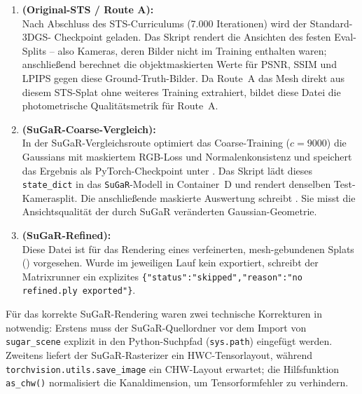 \begin{enumerate}
  \item \textbf{ (Original-STS / Route A):}\\
        Nach Abschluss des STS-Curriculums (7.000 Iterationen) wird der Standard-3DGS-
        Checkpoint  geladen. Das
        Skript  rendert die Ansichten des festen
        Eval-Splits -- also Kameras, deren Bilder nicht im Training enthalten
        waren; anschließend berechnet  die
        objektmaskierten Werte für PSNR, SSIM und LPIPS gegen diese
        Ground-Truth-Bilder.
        Da Route~A das Mesh direkt aus diesem STS-Splat ohne weiteres Training
        extrahiert, bildet diese Datei die photometrische Qualitätsmetrik für Route~A.
  \item \textbf{ (SuGaR-Coarse-Vergleich):}\\
        In der SuGaR-Vergleichsroute optimiert das Coarse-Training ($c=9000$) die
        Gaussians mit maskiertem RGB-Loss und Normalenkonsistenz und speichert das
        Ergebnis als PyTorch-Checkpoint unter
        . Das Skript
         lädt dieses \texttt{state\_dict}
        in das \texttt{SuGaR}-Modell in Container~D und rendert denselben
        Test-Kamerasplit. Die anschließende maskierte Auswertung schreibt
        . Sie misst die Ansichtsqualität der durch
        SuGaR veränderten Gaussian-Geometrie.
  \item \textbf{ (SuGaR-Refined):}\\
        Diese Datei ist für das Rendering eines verfeinerten, mesh-gebundenen Splats
        () vorgesehen. Wurde im jeweiligen Lauf kein
         exportiert, schreibt der Matrixrunner ein explizites
        \texttt{\{\string"status\string":\string"skipped\string",\string"reason\string":\string"no refined.ply exported\string"\}}.
\end{enumerate}

Für das korrekte SuGaR-Rendering waren zwei technische Korrekturen in
 notwendig: Erstens muss der SuGaR-Quellordner
 vor dem Import von \texttt{sugar\_scene} explizit in den
Python-Suchpfad (\texttt{sys.path}) eingefügt werden. Zweitens liefert der
SuGaR-Rasterizer ein HWC-Tensorlayout, während \texttt{torchvision.utils.save\_image}
ein CHW-Layout erwartet; die Hilfsfunktion \texttt{as\_chw()} normalisiert die
Kanaldimension, um Tensorformfehler zu verhindern.

